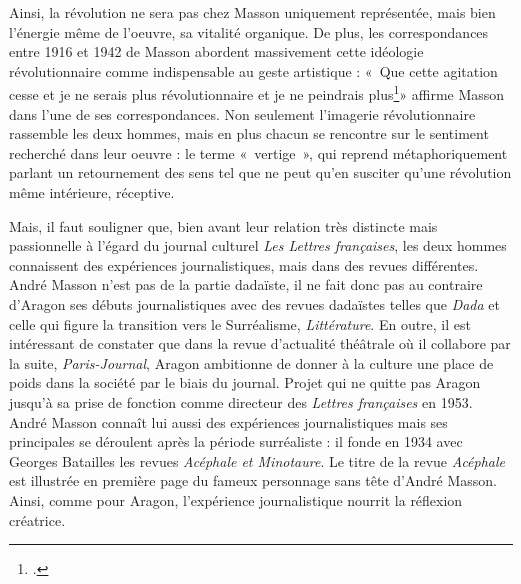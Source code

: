 Ainsi, la révolution ne sera pas chez Masson uniquement représentée, mais bien l’énergie même de l’oeuvre, sa vitalité organique. De plus, les correspondances  entre 1916 et 1942 de Masson abordent massivement cette idéologie  révolutionnaire comme indispensable au geste artistique : « Que cette agitation cesse et je ne serais plus révolutionnaire et je ne peindrais plus\footcite[p.102]{anneessurrealistes}» affirme Masson dans l’une de ses correspondances. Non seulement l’imagerie révolutionnaire rassemble les deux hommes, mais en plus chacun se rencontre sur le sentiment recherché dans leur oeuvre : le terme « vertige », qui reprend métaphoriquement parlant un retournement des sens tel que ne peut qu’en susciter qu’une révolution même intérieure, réceptive. 

Mais, il faut souligner que, bien avant leur relation très distincte mais passionnelle à l’égard du journal culturel \emph{Les Lettres françaises}, les deux hommes connaissent des expériences journalistiques, mais dans des revues différentes. André Masson n’est pas de la partie dadaïste, il ne fait donc pas au contraire d’Aragon ses débuts journalistiques avec des revues dadaïstes telles que \emph{Dada} et celle qui figure la transition vers le Surréalisme, \emph{Littérature}. En outre, il est intéressant de constater que dans la revue d’actualité théâtrale où il collabore par la suite, \emph{Paris-Journal}, Aragon ambitionne de donner à la culture une place de poids dans la société par le biais du journal. Projet qui ne quitte pas Aragon jusqu’à sa prise de fonction comme directeur des \emph{Lettres françaises} en 1953. André Masson connaît lui aussi des expériences journalistiques mais ses principales se déroulent après la période surréaliste : il fonde en 1934 avec Georges Batailles les revues \emph{Acéphale et Minotaure}. Le titre de la revue \emph{Acéphale} est illustrée en première page du fameux personnage sans tête d’André Masson. Ainsi, comme pour Aragon, l’expérience journalistique nourrit la réflexion créatrice. 

